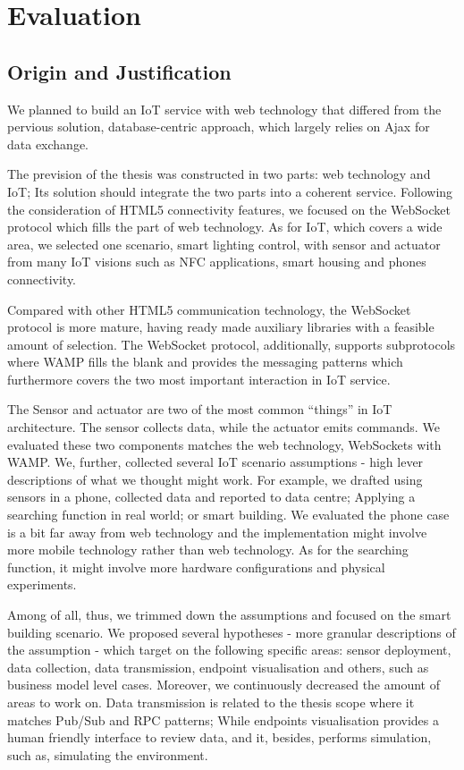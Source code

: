 \chapter{Evaluation}
\label{chapter:evaluation}

\section{Origin and Justification}
We planned to build an IoT service with web technology that differed from the pervious solution, database-centric approach, which largely relies on Ajax for data exchange. 

The prevision of the thesis was constructed in two parts: web technology and IoT; Its solution should integrate the two parts into a coherent service. Following the consideration of HTML5 connectivity features, we focused on the WebSocket protocol which fills the part of web technology. As for IoT, which covers a wide area, we selected one scenario, smart lighting control, with sensor and actuator from many IoT visions such as NFC applications, smart housing and phones connectivity. 

Compared with other HTML5 communication technology, the WebSocket protocol is more mature, having ready made auxiliary libraries with a feasible amount of selection. The WebSocket protocol, additionally, supports subprotocols where WAMP fills the blank and provides the messaging patterns which furthermore covers the two most important interaction in IoT service.

The Sensor and actuator are two of the most common ``things'' in IoT architecture. The sensor collects data, while the actuator emits commands. We evaluated these two components matches the web technology, WebSockets with WAMP. We, further, collected several IoT scenario assumptions - high lever descriptions of what we thought might work. For example, we drafted using sensors in a phone, collected data and reported to data centre; Applying a searching function in real world; or smart building. We evaluated the phone case is a bit far away from web technology and the implementation might involve more mobile technology rather than web technology. As for the searching function, it might involve more hardware configurations and physical experiments. 

Among of all, thus, we trimmed down the assumptions and focused on the smart building scenario. We proposed several hypotheses - more granular descriptions of the assumption - which target on the following specific areas: sensor deployment, data collection, data transmission, endpoint visualisation and others, such as business model level cases. Moreover, we continuously decreased the amount of areas to work on. Data transmission is related to the thesis scope where it matches Pub/Sub and RPC patterns; While endpoints visualisation provides a human friendly interface to review data, and it, besides, performs simulation, such as, simulating the environment.

